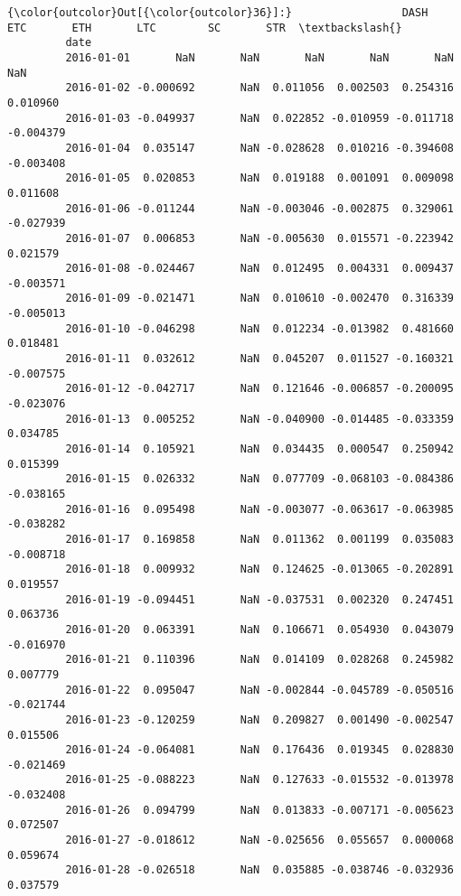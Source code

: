 \documentclass[11pt]{article}
\begin{document}
\begin{Verbatim}[commandchars=\\\{\}]
{\color{outcolor}Out[{\color{outcolor}36}]:}                 DASH       ETC       ETH       LTC        SC       STR  \textbackslash{}
         date                                                                     
         2016-01-01       NaN       NaN       NaN       NaN       NaN       NaN   
         2016-01-02 -0.000692       NaN  0.011056  0.002503  0.254316  0.010960   
         2016-01-03 -0.049937       NaN  0.022852 -0.010959 -0.011718 -0.004379   
         2016-01-04  0.035147       NaN -0.028628  0.010216 -0.394608 -0.003408   
         2016-01-05  0.020853       NaN  0.019188  0.001091  0.009098  0.011608   
         2016-01-06 -0.011244       NaN -0.003046 -0.002875  0.329061 -0.027939   
         2016-01-07  0.006853       NaN -0.005630  0.015571 -0.223942  0.021579   
         2016-01-08 -0.024467       NaN  0.012495  0.004331  0.009437 -0.003571   
         2016-01-09 -0.021471       NaN  0.010610 -0.002470  0.316339 -0.005013   
         2016-01-10 -0.046298       NaN  0.012234 -0.013982  0.481660  0.018481   
         2016-01-11  0.032612       NaN  0.045207  0.011527 -0.160321 -0.007575   
         2016-01-12 -0.042717       NaN  0.121646 -0.006857 -0.200095 -0.023076   
         2016-01-13  0.005252       NaN -0.040900 -0.014485 -0.033359  0.034785   
         2016-01-14  0.105921       NaN  0.034435  0.000547  0.250942  0.015399   
         2016-01-15  0.026332       NaN  0.077709 -0.068103 -0.084386 -0.038165   
         2016-01-16  0.095498       NaN -0.003077 -0.063617 -0.063985 -0.038282   
         2016-01-17  0.169858       NaN  0.011362  0.001199  0.035083 -0.008718   
         2016-01-18  0.009932       NaN  0.124625 -0.013065 -0.202891  0.019557   
         2016-01-19 -0.094451       NaN -0.037531  0.002320  0.247451  0.063736   
         2016-01-20  0.063391       NaN  0.106671  0.054930  0.043079 -0.016970   
         2016-01-21  0.110396       NaN  0.014109  0.028268  0.245982  0.007779   
         2016-01-22  0.095047       NaN -0.002844 -0.045789 -0.050516 -0.021744   
         2016-01-23 -0.120259       NaN  0.209827  0.001490 -0.002547  0.015506   
         2016-01-24 -0.064081       NaN  0.176436  0.019345  0.028830 -0.021469   
         2016-01-25 -0.088223       NaN  0.127633 -0.015532 -0.013978 -0.032408   
         2016-01-26  0.094799       NaN  0.013833 -0.007171 -0.005623  0.072507   
         2016-01-27 -0.018612       NaN -0.025656  0.055657  0.000068  0.059674   
         2016-01-28 -0.026518       NaN  0.035885 -0.038746 -0.032936  0.037579   

\end{Verbatim}
\end{document}

